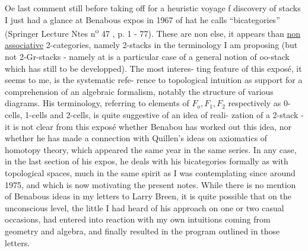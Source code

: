 Oe last comment still before taking off for a heuristic voyage
f discovery of stacks\hand{!} I just had a glance at Benabous expos in 1967
of hat he calls ``bicategories''  (Springer Lecture Ntes n\textsuperscript{o} 47 ,  p. 1
- 77).  These are non else,  it appears\hand{,}  than \deleted{(}\uline{non associative}
2-categories,  namely 2-stacks  in the terminology I am proposing
(but not 2-Gr-stacks  -  namely at is a particular case of a general
notion of oo-stack which  has still to be developped).  The most interes-%
\hand{-}ting feature of this exposé,  it seems to me,  is the systematic refe-%
rence to topological intuition as  support for a comprehension of an
algebraic formalism,  notably  the structure of various diagrams. His
terminology,  referring to elements of $F_o,F_1,F_2$ respectively as 0-cells,
1-cells and 2-cells,  is quite suggestive of an idea of   reali-%
zation of a 2-stack  -  it is not clear from this exposé whether Benabou
has worked out this idea,  nor whether he has made a connection with
Quillen's ideas on axiomatics of homotopy theory,  which appeared the
same year in the same series. In any case,  in the last section of his
expos,  he deals with his bicategories formally as with topological
spaces,  much in the same spirit as \hand{(} I was contemplating since 
around 1975,  and which is now motivating the present notes.  While
there is no mention of Benabous ideas in my letters to Larry Breen,
it is quite possible that on the unconscious level,  the little I had
heard of his approach on one or two casual occasions,  had entered into
reaction with my own intuitions\hand{,} coming  from geometry and 
algebra,  and finally resulted in the program outlined in those letters.
